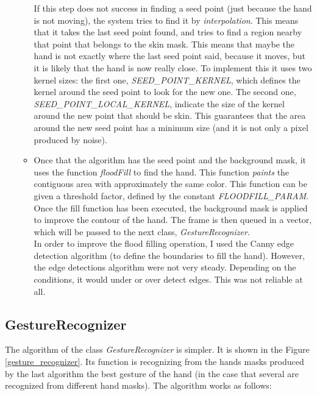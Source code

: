 \documentclass[11pt,a4paper]{article}
\begin{document}
\begin{itemize}
\begin{itemize}
	If this step does not success in finding a seed point (just because the hand is not moving), the system tries to find it by \textit{interpolation}. This means that it takes the last seed point found, and tries to find a region nearby that point that belongs to the skin mask. This means that maybe the hand is not exactly where the last seed point said, because it moves, but it is likely that the hand is now really close. To implement this it uses two kernel sizes: the first one, \textit{SEED\_POINT\_KERNEL}, which defines the kernel around the seed point to look for the new one. The second one, \textit{SEED\_POINT\_LOCAL\_KERNEL}, indicate the size of the kernel around the new point that should be skin. This guarantees that the area around the new seed point has a minimum size (and it is not only a pixel produced by noise).
	
	\item Once that the algorithm has the seed point and the background mask, it uses the function \textit{floodFill} to find the hand. This function \textit{paints} the contiguous area with approximately the same color. This function can be given a threshold factor, defined by the constant \textit{FLOODFILL\_PARAM}. Once the fill function has been executed, the background mask is applied to improve the contour of the hand. The frame is then queued in a vector, which will be passed to the next class, \textit{GestureRecognizer}.\\

In order to improve the flood filling operation, I used the Canny edge detection algorithm (to define the boundaries to fill the hand). However, the edge detections algorithm were not very steady. Depending on the conditions, it would under or over detect edges. This was not reliable at all.

	\end{itemize}

\end{itemize}

\subsection{GestureRecognizer}
The algorithm of the class \textit{GestureRecognizer} is simpler. It is shown in the Figure \ref{gesture_recognizer}. Its function is recognizing from the hands masks produced by the last algorithm the best gesture of the hand (in the case that several are recognized from different hand masks). The algorithm works as follows:
\end{document}
